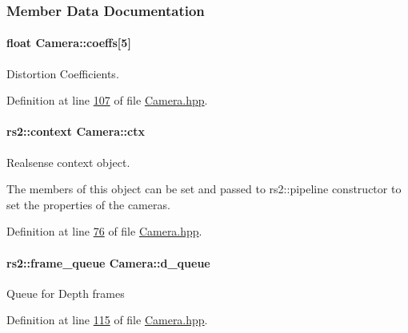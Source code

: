 \subsubsection{Member Data Documentation}
\paragraph[{\texorpdfstring{coeffs}{coeffs}}]{\setlength{\rightskip}{0pt plus 5cm}float Camera\+::coeffs\mbox{[}5\mbox{]}}\hypertarget{classCamera_af6b42da84223170eb6434a3df1d677af}{}\label{classCamera_af6b42da84223170eb6434a3df1d677af}


Distortion Coefficients. 



Definition at line \hyperlink{Camera_8hpp_source_l00107}{107} of file \hyperlink{Camera_8hpp_source}{Camera.\+hpp}.

\paragraph[{\texorpdfstring{ctx}{ctx}}]{\setlength{\rightskip}{0pt plus 5cm}rs2\+::context Camera\+::ctx\hspace{0.3cm}{\ttfamily [private]}}\hypertarget{classCamera_a4373bc8793e3bb1d6eb2cca3eb25a31e}{}\label{classCamera_a4373bc8793e3bb1d6eb2cca3eb25a31e}


Realsense context object. 

The members of this object can be set and passed to rs2\+::pipeline constructor to set the properties of the cameras. 

Definition at line \hyperlink{Camera_8hpp_source_l00076}{76} of file \hyperlink{Camera_8hpp_source}{Camera.\+hpp}.

\paragraph[{\texorpdfstring{d\+\_\+queue}{d_queue}}]{\setlength{\rightskip}{0pt plus 5cm}rs2\+::frame\+\_\+queue Camera\+::d\+\_\+queue}\hypertarget{classCamera_a84a3a043e61b967fb1dc6fbe62bf33aa}{}\label{classCamera_a84a3a043e61b967fb1dc6fbe62bf33aa}
Queue for Depth frames 

Definition at line \hyperlink{Camera_8hpp_source_l00115}{115} of file \hyperlink{Camera_8hpp_source}{Camera.\+hpp}.

